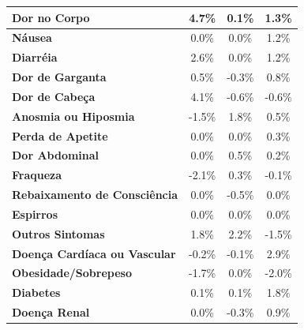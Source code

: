 \begin{table}[H]
\begin{tabular}{|l|c|c|c|}
    \textbf{Dor no Corpo}                & 4.7\%        & 0.1\%                      & 1.3\%                       \\ \hline
    \textbf{Náusea}                      & 0.0\%        & 0.0\%                      & 1.2\%                       \\ \hline
    \textbf{Diarréia}                    & 2.6\%        & 0.0\%                      & 1.2\%                       \\ \hline
    \textbf{Dor de Garganta}             & 0.5\%        & -0.3\%                     & 0.8\%                       \\ \hline
    \textbf{Dor de Cabeça}               & 4.1\%        & -0.6\%                     & -0.6\%                      \\ \hline
    \textbf{Anosmia ou Hiposmia}         & -1.5\%       & 1.8\%                      & 0.5\%                       \\ \hline
    \textbf{Perda de Apetite}            & 0.0\%        & 0.0\%                      & 0.3\%                       \\ \hline
    \textbf{Dor Abdominal}               & 0.0\%        & 0.5\%                      & 0.2\%                       \\ \hline
    \textbf{Fraqueza}                    & -2.1\%       & 0.3\%                      & -0.1\%                      \\ \hline
    \textbf{Rebaixamento de Consciência} & 0.0\%        & -0.5\%                     & 0.0\%                       \\ \hline
    \textbf{Espirros}                    & 0.0\%        & 0.0\%                      & 0.0\%                       \\ \hline
    \textbf{Outros Sintomas}             & 1.8\%        & 2.2\%                      & -1.5\%                      \\ \hline
    \textbf{Doença Cardíaca ou Vascular} & -0.2\%       & -0.1\%                     & 2.9\%                       \\ \hline
    \textbf{Obesidade/Sobrepeso}         & -1.7\%       & 0.0\%                      & -2.0\%                      \\ \hline
    \textbf{Diabetes}                    & 0.1\%        & 0.1\%                      & 1.8\%                       \\ \hline
    \textbf{Doença Renal}                & 0.0\%        & -0.3\%                     & 0.9\%                       \\ \hline

\end{tabular}
\end{table}
